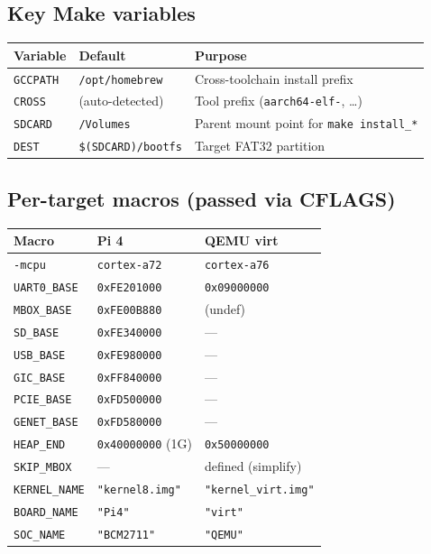 \documentclass[a4paper,11pt]{article}
\begin{document}
\subsection{Key Make variables}
\begin{center}\footnotesize
\begin{tabular}{@{}l l p{7.2cm}@{}}
\toprule
\textbf{Variable} & \textbf{Default} & \textbf{Purpose}\\
\midrule
\verb|GCCPATH| & \verb|/opt/homebrew| & Cross-toolchain install prefix\\
\verb|CROSS|   & (auto-detected)     & Tool prefix (\verb|aarch64-elf-|, \dots)\\
\verb|SDCARD|  & \verb|/Volumes|     & Parent mount point for \verb|make install_*|\\
\verb|DEST|    & \verb|$(SDCARD)/bootfs| & Target FAT32 partition\\
\bottomrule
\end{tabular}
\end{center}

\subsection{Per-target macros (passed via CFLAGS)}
\begin{center}\footnotesize
\begin{tabular}{@{}l l l@{}}
\toprule
\textbf{Macro} & \textbf{Pi 4} & \textbf{QEMU virt}\\
\midrule
\verb|-mcpu|       & \verb|cortex-a72| & \verb|cortex-a76|\\
\verb|UART0_BASE|  & \verb|0xFE201000| & \verb|0x09000000|\\
\verb|MBOX_BASE|   & \verb|0xFE00B880| & (undef)\\
\verb|SD_BASE|     & \verb|0xFE340000| & ---\\
\verb|USB_BASE|    & \verb|0xFE980000| & ---\\
\verb|GIC_BASE|    & \verb|0xFF840000| & ---\\
\verb|PCIE_BASE|   & \verb|0xFD500000| & ---\\
\verb|GENET_BASE|  & \verb|0xFD580000| & ---\\
\verb|HEAP_END|    & \verb|0x40000000| (1G) & \verb|0x50000000|\\
\verb|SKIP_MBOX|   & ---               & defined (simplify)\\
\verb|KERNEL_NAME| & \verb|"kernel8.img"| & \verb|"kernel_virt.img"|\\
\verb|BOARD_NAME|  & \verb|"Pi4"|      & \verb|"virt"|\\
\verb|SOC_NAME|    & \verb|"BCM2711"|  & \verb|"QEMU"|\\
\bottomrule
\end{tabular}
\end{center}
\end{document}
